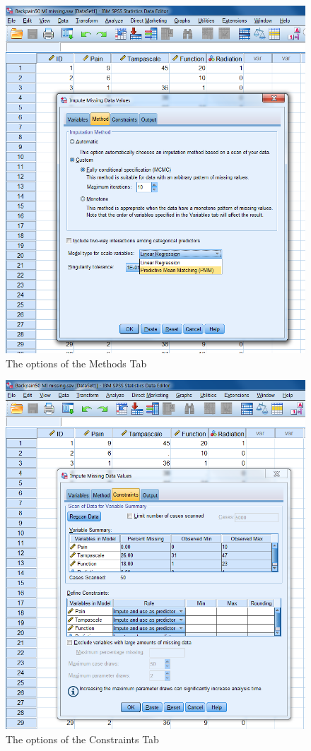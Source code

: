 \documentclass[
]{book}
\begin{document}
\begin{figure}

{\centering \includegraphics[width=0.9\linewidth]{images/fig8.2} 

}

\caption{The options of the Methods Tab}\label{fig:fig8-2}
\end{figure}

\begin{figure}

{\centering \includegraphics[width=0.9\linewidth]{images/fig8.3} 

}

\caption{The options of the Constraints Tab}\label{fig:fig8-3}
\end{figure}
\end{document}
